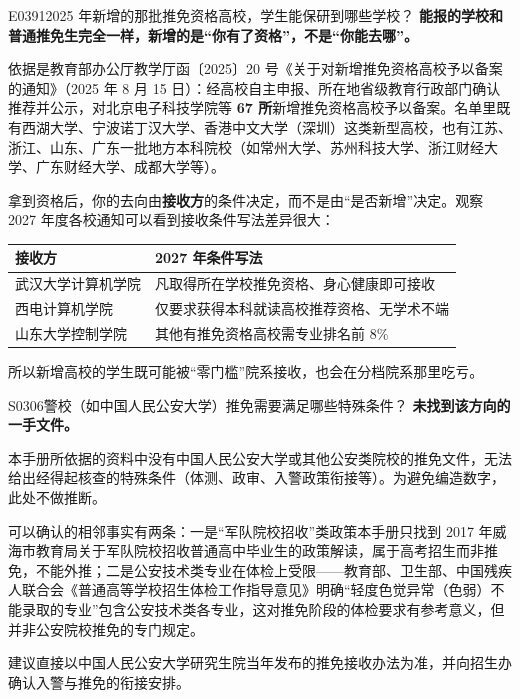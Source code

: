 \begin{qa}{E0391}{2025 年新增的那批推免资格高校，学生能保研到哪些学校？}
\textbf{能报的学校和普通推免生完全一样，新增的是“你有了资格”，不是“你能去哪”。}

依据是教育部办公厅教学厅函〔2025〕20 号《关于对新增推免资格高校予以备案的通知》（2025 年 8 月 15 日）：经高校自主申报、所在地省级教育行政部门确认推荐并公示，对北京电子科技学院等 \textbf{67 所}新增推免资格高校予以备案。名单里既有西湖大学、宁波诺丁汉大学、香港中文大学（深圳）这类新型高校，也有江苏、浙江、山东、广东一批地方本科院校（如常州大学、苏州科技大学、浙江财经大学、广东财经大学、成都大学等）。

拿到资格后，你的去向由\textbf{接收方}的条件决定，而不是由“是否新增”决定。观察 2027 年度各校通知可以看到接收条件写法差异很大：

\par\vspace{2pt}\nobreak\begin{center}\footnotesize
\begin{tabularx}{\textwidth}{>{\raggedright\arraybackslash}X>{\raggedright\arraybackslash}X}
\toprule
\textbf{接收方} & \textbf{2027 年条件写法} \\ \midrule
武汉大学计算机学院 & 凡取得所在学校推免资格、身心健康即可接收 \\
西电计算机学院 & 仅要求获得本科就读高校推荐资格、无学术不端 \\
山东大学控制学院 & 其他有推免资格高校需专业排名前 8\% \\
\bottomrule
\end{tabularx}
\end{center}\vspace{2pt}\par

所以新增高校的学生既可能被“零门槛”院系接收，也会在分档院系那里吃亏。
\end{qa}

\begin{qa}{S0306}{警校（如中国人民公安大学）推免需要满足哪些特殊条件？}
\textbf{未找到该方向的一手文件。}

本手册所依据的资料中没有中国人民公安大学或其他公安类院校的推免文件，无法给出经得起核查的特殊条件（体测、政审、入警政策衔接等）。为避免编造数字，此处不做推断。

可以确认的相邻事实有两条：一是“军队院校招收”类政策本手册只找到 2017 年威海市教育局关于军队院校招收普通高中毕业生的政策解读，属于高考招生而非推免，不能外推；二是公安技术类专业在体检上受限——教育部、卫生部、中国残疾人联合会《普通高等学校招生体检工作指导意见》明确“轻度色觉异常（色弱）不能录取的专业”包含公安技术类各专业，这对推免阶段的体检要求有参考意义，但并非公安院校推免的专门规定。

建议直接以中国人民公安大学研究生院当年发布的推免接收办法为准，并向招生办确认入警与推免的衔接安排。
\end{qa}

